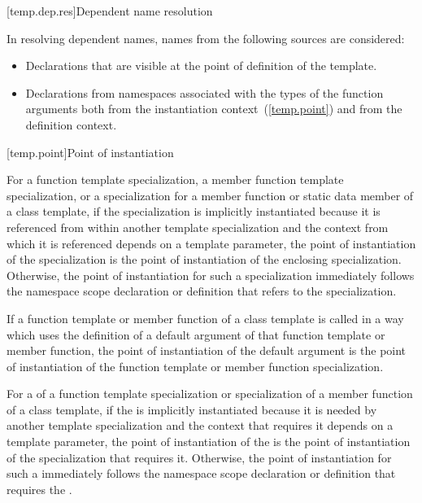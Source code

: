 [temp.dep.res]{Dependent name resolution}

\pnum
{}%
In resolving dependent names, names from the following sources are considered:

\begin{itemize}
\item
Declarations that are visible at the point of definition of the
template.
\item
Declarations from namespaces associated with the types of the
function arguments both from the instantiation context~(\ref{temp.point})
and from the definition context.
\end{itemize}

[temp.point]{Point of instantiation}

\pnum
{}%
For a function template specialization, a member function template
specialization, or a specialization for a member function or static data member
of a class template,
if the specialization is implicitly instantiated because it is referenced
from within another template specialization and
the context from which it is referenced depends on a template parameter,
the point of instantiation of the specialization is the point of instantiation
of the enclosing specialization.
Otherwise, the point of instantiation for such a specialization immediately
follows the namespace scope declaration
or definition that refers to the specialization.

\pnum
If a function template or member function of a class template is called
in a way which uses the definition of a default argument of that function
template or member function,
the point of instantiation of the default argument is the point of
instantiation of the function template or member function specialization.

\pnum
For a  of a function template
specialization or specialization of a member function of a class template, if
the  is implicitly instantiated because
it is needed by another template specialization and the context that requires
it depends on a template parameter, the point of instantiation of the
 is the point of instantiation of the
specialization that requires it. Otherwise, the point of instantiation for such
a  immediately follows the namespace
scope declaration or definition that requires the
.



